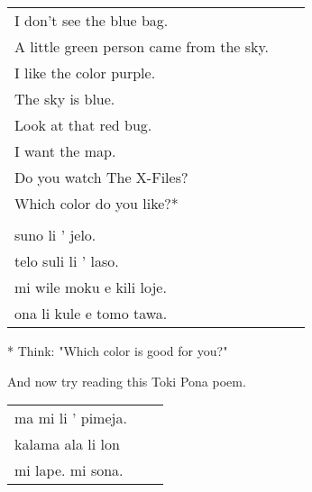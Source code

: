 \begin{supertabular}{p{5,5cm}|ll}
I don't see the blue bag. &&   \\ %
A little green person came from the sky. &&   \\ %
I like the color purple.  &&  \\ %
The sky is blue. &&   \\ %
Look at that red bug.  &&  \\ %
I want the map.  &&  \\ %
Do you watch The X-Files? &&  \\  %
Which color do you like?* &&  \\  %
 && \\ %
suno li ' jelo. &&   \\ %
telo suli li ' laso.  &&  \\ %
mi wile moku e kili loje.  &&  \\ %
ona li kule e tomo tawa. &&   \\ %
\end{supertabular} 

* Think: "Which color is good for you?" 

And now try reading this Toki Pona poem. 

\begin{supertabular}{p{5,5cm}|ll}
ma mi li ' pimeja. && \\ %
kalama ala li lon && \\ %
mi lape. mi sona. && \\ %
\end{supertabular} 
